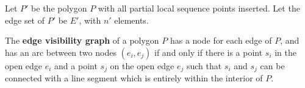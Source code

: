\documentclass[]{styles/svproc}  %
\begin{document}
Let $P'$ be the polygon $P$ with all partial local sequence points inserted.
Let the edge set of $P'$ be $E'$, with $n'$ elements.

\begin{definition}
The \textbf{edge visibility graph} of a polygon $P$ has a node for each edge of
$P$, and has an arc between two nodes $(e_i, e_j)$ if and only if there is a
point $s_i$ in the open edge $e_i$ and a point $s_j$ on the open edge $e_j$ such
that $s_i$ and $s_j$ can be connected with a line segment which is entirely
within the interior of $P$.
\end{definition}

%
%
%
\end{document}
